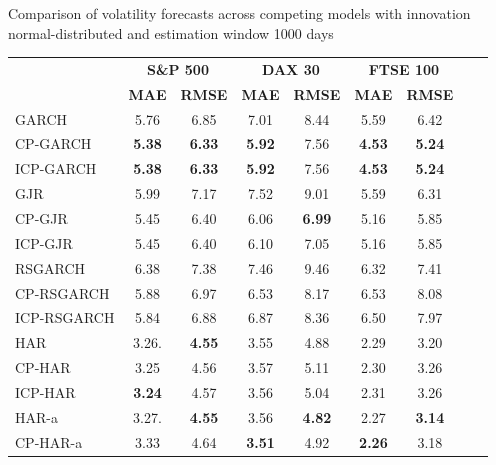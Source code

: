 \documentclass[preprint,12pt,authoryear]{elsarticle}
\begin{document}
\begin{center}
\begin{threeparttable}
\centering \footnotesize
\caption{\footnotesize Comparison of volatility forecasts across competing models with innovation normal-distributed and estimation window 1000 days}\label{tab36}
\begin{tabular}{l c c c c c c c c}
\toprule
 & \multicolumn{2}{c}{\textbf{S\&P 500}} & \multicolumn{2}{c}{\textbf{DAX 30}} & \multicolumn{2}{c}{\textbf{FTSE 100}} \\
\cmidrule(r){2-3} \cmidrule(r){4-5} \cmidrule(r){6-7}
 & \textbf{MAE} & \textbf{RMSE} & \textbf{MAE} & \textbf{RMSE} & \textbf{MAE} & \textbf{RMSE} \\
\cmidrule{2-7}
GARCH        &  5.76         & 6.85          &  7.01         & 8.44          & 5.59  & 6.42  \\
CP-GARCH     & \textbf{5.38} & \textbf{6.33} & \textbf{5.92} & 7.56 & \textbf{4.53} & \textbf{5.24} \\
ICP-GARCH    & \textbf{5.38} & \textbf{6.33} & \textbf{5.92} & 7.56 & \textbf{4.53} & \textbf{5.24}  \\
GJR          &  5.99         & 7.17          &  7.52         & 9.01          & 5.59  &  6.31  \\
CP-GJR       &  5.45         & 6.40          &  6.06         & \textbf{6.99} & 5.16  &  5.85 \\
ICP-GJR      &  5.45         & 6.40          &  6.10         & 7.05          & 5.16  &  5.85  \\
RSGARCH      &  6.38         & 7.38          &  7.46         & 9.46          & 6.32  &  7.41  \\
CP-RSGARCH   &  5.88         & 6.97          &  6.53         & 8.17          & 6.53  &  8.08  \\
ICP-RSGARCH  &  5.84         & 6.88          &  6.87         & 8.36          & 6.50  &  7.97  \\
\midrule
HAR          & 3.26.         & \textbf{4.55} & 3.55 & 4.88          & 2.29          & 3.20 \\
CP-HAR       & 3.25          & 4.56          & 3.57 & 5.11          & 2.30          & 3.26 \\
ICP-HAR      & \textbf{3.24} & 4.57          & 3.56 & 5.04          & 2.31          & 3.26 \\
HAR-a        & 3.27.         & \textbf{4.55} & 3.56 & \textbf{4.82} & 2.27  & \textbf{3.14} \\
CP-HAR-a     & 3.33          & 4.64 & \textbf{3.51} & 4.92          & \textbf{2.26} & 3.18 \\

\end{tabular}
\end{threeparttable}
\end{center}
\end{document}
